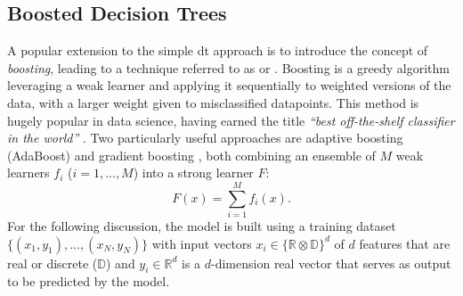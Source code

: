 \subsection{Boosted Decision Trees}
A popular extension to the simple \gls{dt} approach is to introduce the concept of \textit{boosting}, leading to a technique referred to as \textit{} or \textit{}. Boosting is a greedy algorithm leveraging a weak learner and applying it sequentially to weighted versions of the data, with a larger weight given to misclassified datapoints. This method is hugely popular in data science, having earned the title \textit{``best off-the-shelf classifier in the world''} \cite{baggingML}. Two particularly useful approaches are adaptive boosting (AdaBoost) \cite{Adaboost} and gradient boosting \cite{gradientBoosting}, both combining an ensemble of $M$ weak learners $f_i$ ($i = 1, ..., M$) into a strong learner $F$: \[F(x) = \sum_{i=1}^M f_i(x).\] For the following discussion, the model is built using a training dataset $ \{(x_1, y_1), ..., (x_N, y_N)\}$ with input vectors $x_i \in \{\mathbb{R} \otimes \mathbb{D}\}^d$ of $d$ features that are real or discrete ($\mathbb{D}$) and $y_i \in \mathbb{R}^d$ is a $d$-dimension real vector that serves as output to be predicted by the model.

